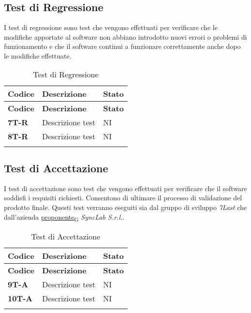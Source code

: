 \subsection{Test di Regressione}
I test di regressione sono test che vengono effettuati per verificare che le modifiche apportate al software non abbiano introdotto nuovi errori o problemi di funzionamento e che il software continui a funzionare correttamente anche dopo le modifiche effettuate. \\
\begin{longtable}{|>{\raggedright\arraybackslash}m{}|>{\raggedright\arraybackslash}m{}|>{\raggedright\arraybackslash}m{}|}
	\hline
	\textbf{Codice} & \textbf{Descrizione} & \textbf{Stato} \\
	\hline
	\endfirsthead
	\hline
	\textbf{Codice} & \textbf{Descrizione} & \textbf{Stato} \\
	\endhead
	\textbf{7T-R}   & Descrizione test     & NI             \\
	\hline
	\textbf{8T-R}   & Descrizione test     & NI             \\
	\hline
	\caption{Test di Regressione} %
	\label{table:15}
\end{longtable}

\subsection{Test di Accettazione}
I test di accettazione sono test che vengono effettuati per verificare che il software soddisfi i requisiti richiesti. Consentono di ultimare il processo di validazione del prodotto finale. Questi test verranno eseguiti sia dal gruppo di sviluppo \textit{7Last} che dall'azienda \href{https://7last.github.io/docs/rtb/documentazione-interna/glossario\#proponente}{proponente\textsubscript{G}} \textit{SyncLab S.r.l.}. \\
\begin{longtable}{|>{\raggedright\arraybackslash}m{}|>{\raggedright\arraybackslash}m{}|>{\raggedright\arraybackslash}m{}|}
	\hline
	\textbf{Codice} & \textbf{Descrizione} & \textbf{Stato} \\
	\hline
	\endfirsthead
	\hline
	\textbf{Codice} & \textbf{Descrizione} & \textbf{Stato} \\
	\endhead
	\textbf{9T-A}   & Descrizione test     & NI             \\
	\hline
	\textbf{10T-A}   & Descrizione test     & NI             \\
	\hline
	\caption{Test di Accettazione} %
	\label{table:16}
\end{longtable}
